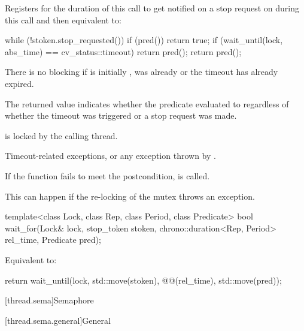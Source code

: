 \begin{itemdescr}
\pnum
\effects
Registers for the duration of this call 
to get notified on a stop request on 
during this call and then equivalent to:
\begin{codeblock}
while (!stoken.stop_requested()) {
  if (pred())
    return true;
  if (wait_until(lock, abs_time) == cv_status::timeout)
    return pred();
}
return pred();
\end{codeblock}

\pnum
\begin{note}
There is no blocking if  is initially ,
 was already 
or the timeout has already expired.
\end{note}

\pnum
\begin{note}
The returned value indicates whether the predicate evaluated to 
regardless of whether the timeout was triggered or a stop request was made.
\end{note}

\pnum
\ensures
{} is locked by the calling thread.

\pnum
\throws
Timeout-related exceptions,
or any exception thrown by .

\pnum
\remarks
If the function fails to meet the postcondition,
 is called.
\begin{note}
This can happen if the re-locking of the mutex throws an exception.
\end{note}
\end{itemdescr}

\begin{itemdecl}
template<class Lock, class Rep, class Period, class Predicate>
  bool wait_for(Lock& lock, stop_token stoken,
                chrono::duration<Rep, Period> rel_time, Predicate pred);
\end{itemdecl}

\begin{itemdescr}
\pnum
\effects
Equivalent to:
\begin{codeblock}
return wait_until(lock, std::move(stoken), @@(rel_time), std::move(pred));
\end{codeblock}
\end{itemdescr}

[thread.sema]{Semaphore}

[thread.sema.general]{General}

